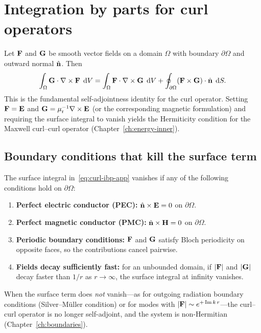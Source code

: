 \section{Integration by parts for curl operators}
\label{sec:integration-by-parts}

Let $\mathbf{F}$ and $\mathbf{G}$ be smooth vector fields on a domain $\Omega$ with
boundary $\partial\Omega$ and outward normal $\hat{\mathbf{n}}$. Then
\begin{equation}
 \int_\Omega \mathbf{G}\cdot\nabla\times\mathbf{F}\;\mathop{}\!\mathrm{d} V
 = \int_\Omega \mathbf{F}\cdot\nabla\times\mathbf{G}\;\mathop{}\!\mathrm{d} V
 + \oint_{\partial\Omega}(\mathbf{F}\times\mathbf{G})\cdot\hat{\mathbf{n}}\;\mathop{}\!\mathrm{d} S.
 \label{eq:curl-ibp-app}
\end{equation}
This is the fundamental self-adjointness identity for the curl operator.
Setting $\mathbf{F} = \mathbf{E}$ and $\mathbf{G} = \mu_{\mathrm{r}}^{-1}\nabla\times\mathbf{E}$ (or the
corresponding magnetic formulation) and requiring the surface integral
to vanish yields the Hermiticity condition for the Maxwell curl--curl
operator (Chapter~\ref{ch:energy-inner}).

\subsection{Boundary conditions that kill the surface term}
\label{ssec:vanishing-surface}

The surface integral in~\eqref{eq:curl-ibp-app} vanishes if any of the
following conditions hold on $\partial\Omega$:
\begin{enumerate}
 \item \textbf{Perfect electric conductor (PEC):}
 $\hat{\mathbf{n}}\times\mathbf{E} = 0$ on $\partial\Omega$.
 \item \textbf{Perfect magnetic conductor (PMC):}
 $\hat{\mathbf{n}}\times\mathbf{H} = 0$ on $\partial\Omega$.
 \item \textbf{Periodic boundary conditions:}
 $\mathbf{F}$ and $\mathbf{G}$ satisfy Bloch periodicity on opposite faces, so the
 contributions cancel pairwise.
 \item \textbf{Fields decay sufficiently fast:}
 for an unbounded domain, if $|\mathbf{F}|$ and $|\mathbf{G}|$ decay faster than
 $1/r$ as $r \to \infty$, the surface integral at infinity vanishes.
\end{enumerate}
When the surface term does \emph{not} vanish---as for outgoing radiation
boundary conditions (Silver--M\"uller condition) or for modes with
$|\mathbf{F}| \sim e^{+\operatorname{Im} k\,r}$---the curl--curl operator is no longer
self-adjoint, and the system is non-Hermitian
(Chapter~\ref{ch:boundaries}).


